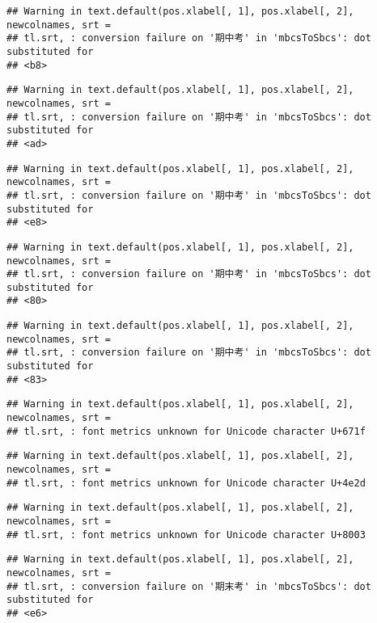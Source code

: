 \documentclass[
]{book}
\begin{document}
\begin{verbatim}
## Warning in text.default(pos.xlabel[, 1], pos.xlabel[, 2], newcolnames, srt =
## tl.srt, : conversion failure on '期中考' in 'mbcsToSbcs': dot substituted for
## <b8>
\end{verbatim}

\begin{verbatim}
## Warning in text.default(pos.xlabel[, 1], pos.xlabel[, 2], newcolnames, srt =
## tl.srt, : conversion failure on '期中考' in 'mbcsToSbcs': dot substituted for
## <ad>
\end{verbatim}

\begin{verbatim}
## Warning in text.default(pos.xlabel[, 1], pos.xlabel[, 2], newcolnames, srt =
## tl.srt, : conversion failure on '期中考' in 'mbcsToSbcs': dot substituted for
## <e8>
\end{verbatim}

\begin{verbatim}
## Warning in text.default(pos.xlabel[, 1], pos.xlabel[, 2], newcolnames, srt =
## tl.srt, : conversion failure on '期中考' in 'mbcsToSbcs': dot substituted for
## <80>
\end{verbatim}

\begin{verbatim}
## Warning in text.default(pos.xlabel[, 1], pos.xlabel[, 2], newcolnames, srt =
## tl.srt, : conversion failure on '期中考' in 'mbcsToSbcs': dot substituted for
## <83>
\end{verbatim}

\begin{verbatim}
## Warning in text.default(pos.xlabel[, 1], pos.xlabel[, 2], newcolnames, srt =
## tl.srt, : font metrics unknown for Unicode character U+671f
\end{verbatim}

\begin{verbatim}
## Warning in text.default(pos.xlabel[, 1], pos.xlabel[, 2], newcolnames, srt =
## tl.srt, : font metrics unknown for Unicode character U+4e2d
\end{verbatim}

\begin{verbatim}
## Warning in text.default(pos.xlabel[, 1], pos.xlabel[, 2], newcolnames, srt =
## tl.srt, : font metrics unknown for Unicode character U+8003
\end{verbatim}

\begin{verbatim}
## Warning in text.default(pos.xlabel[, 1], pos.xlabel[, 2], newcolnames, srt =
## tl.srt, : conversion failure on '期末考' in 'mbcsToSbcs': dot substituted for
## <e6>
\end{verbatim}
\end{document}
